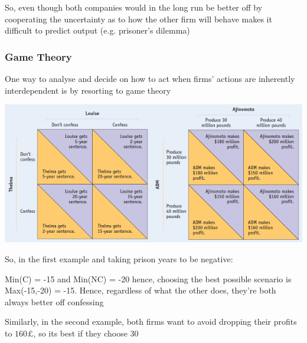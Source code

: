 \documentclass[english,course]{Notes}
\begin{document}
\par{So, even though both companies would in the long run be better off by cooperating the uncertainty as to how the other firm will behave makes it difficult to predict output (e.g. prisoner's dilemma) }

\subsubsection{Game Theory}

\par{One way to analyse and decide on how to act when firms' actions are inherently interdependent is by resorting to game theory }




\includegraphics[width=0.5\textwidth]{g}\includegraphics[width=0.5\textwidth]{g2}

\par{So, in the first example and taking prison years to be negative:}
\par{Min(C) = -15 and Min(NC) = -20 hence, choosing the best possible scenario is Max(-15,-20) = -15. Hence, regardless of what the other does, they're both always better off confessing}
\par{Similarly, in the second example, both firms want to avoid dropping their profits to $160\pounds$, so its best if they choose $30$} 
\end{document}
